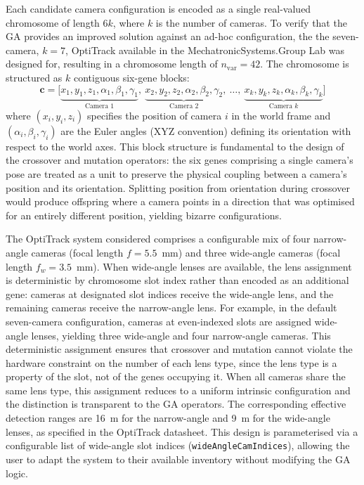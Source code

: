 Each candidate camera configuration is encoded as a single real-valued chromosome of length $6k$, where $k$ is the number of cameras. To verify that the \gls{GA} provides an improved solution against an ad-hoc configuration, the the seven-camera, $k = 7$, OptiTrack available in the MechatronicSystems.Group Lab was designed for, resulting in a chromosome length of $n_{\text{var}} = 42$. The chromosome is structured as $k$ contiguous six-gene blocks:
%
\begin{equation}
\label{eq:chromosome}
\mathbf{c} = \bigl[\underbrace{x_1, y_1, z_1, \alpha_1, \beta_1, \gamma_1}_{\text{Camera 1}},\ \underbrace{x_2, y_2, z_2, \alpha_2, \beta_2, \gamma_2}_{\text{Camera 2}},\ \ldots,\ \underbrace{x_k, y_k, z_k, \alpha_k, \beta_k, \gamma_k}_{\text{Camera } k}\bigr]
\end{equation}
%
where $(x_i, y_i, z_i)$ specifies the position of camera $i$ in the world frame and $(\alpha_i, \beta_i, \gamma_i)$ are the Euler angles (XYZ convention) defining its orientation with respect to the world axes. This block structure is fundamental to the design of the crossover and mutation operators: the six genes comprising a single camera's pose are treated as a unit to preserve the physical coupling between a camera's position and its orientation. Splitting position from orientation during crossover would produce offspring where a camera points in a direction that was optimised for an entirely different position, yielding bizarre configurations.

The OptiTrack system considered comprises a configurable mix of four narrow-angle cameras (focal length $f = 5.5$~mm) and three wide-angle cameras (focal length $f_w = 3.5$~mm). When wide-angle lenses are available, the lens assignment is deterministic by chromosome slot index rather than encoded as an additional gene: cameras at designated slot indices receive the wide-angle lens, and the remaining cameras receive the narrow-angle lens. For example, in the default seven-camera configuration, cameras at even-indexed slots are assigned wide-angle lenses, yielding three wide-angle and four narrow-angle cameras. This deterministic assignment ensures that crossover and mutation cannot violate the hardware constraint on the number of each lens type, since the lens type is a property of the slot, not of the genes occupying it. When all cameras share the same lens type, this assignment reduces to a uniform intrinsic configuration and the distinction is transparent to the GA operators. The corresponding effective detection ranges are 16~m for the narrow-angle and 9~m for the wide-angle lenses, as specified in the OptiTrack datasheet. This design is parameterised via a configurable list of wide-angle slot indices (\texttt{wideAngleCamIndices}), allowing the user to adapt the system to their available inventory without modifying the GA logic.

